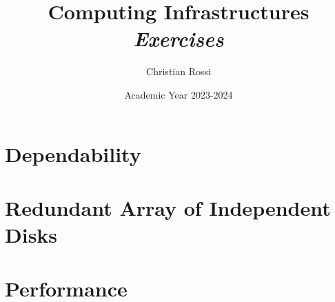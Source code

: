 \documentclass[12pt, a4paper]{report}
\title{Computing Infrastructures \\ \textit{Exercises}}
\author{Christian Rossi}
\date{Academic Year 2023-2024}
\begin{document}
    \maketitle

    

    \cleardoublepage

    \tableofcontents

    \cleardoublepage

    \chapter{Dependability}
    
    
    
    
    
    
    
    
    
    
    

    \chapter{Redundant Array of Independent Disks}
    
    
    
    
    
    
    
    
    

    \chapter{Performance}
    
    
    
    
    
    
    
    
    
    
    
    
    
    
    
    
    
    
    
    
    
    
    
    
    
\end{document}
